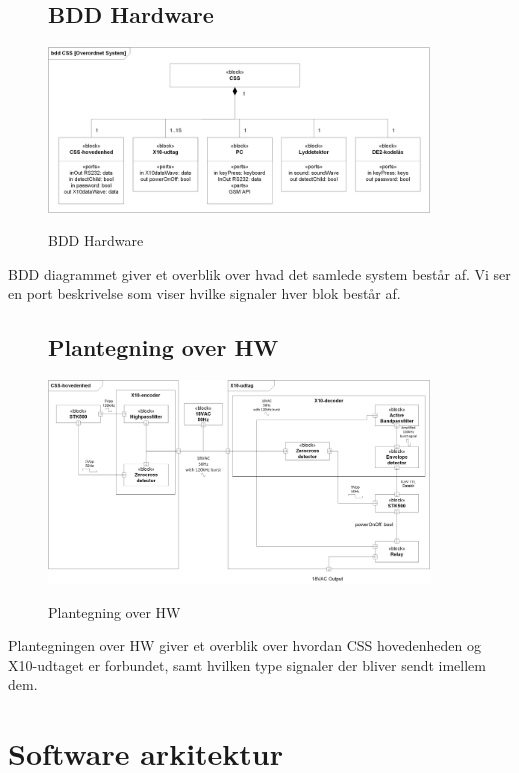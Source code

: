 \begin{figure}[!htbp] \centering
\subsection{BDD Hardware}
{\includegraphics[width=0.9\textwidth]{billeder/diagrammer/BDD_Hardware}}
\caption{BDD Hardware}
\label{lab:bddhardware}
\raggedright
\end{figure}
BDD diagrammet giver et overblik over hvad det samlede system består af. Vi ser en port beskrivelse som viser hvilke signaler hver blok består af.


\begin{figure}[!htbp] \centering
\subsection{Plantegning over HW}
{\includegraphics[width=0.9\textwidth]{billeder/diagrammer/Plantegning_over_HW}}
\caption{Plantegning over HW}
\label{lab:Plantegning over HW}
\raggedright
\end{figure}
Plantegningen over HW giver et overblik over hvordan CSS hovedenheden og X10-udtaget er forbundet, samt hvilken type signaler der bliver sendt imellem dem.

\clearpage

\section{Software arkitektur}
